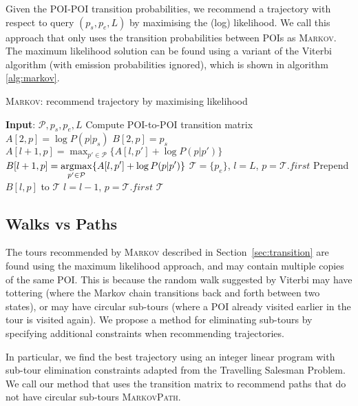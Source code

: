 Given the POI-POI transition probabilities, we recommend a trajectory with respect to query
$(p_s, p_e, L)$ by maximising the (log) likelihood. We call this approach that only uses the
transition probabilities between POIs as \textsc{Markov}. The maximum likelihood solution
can be found using a variant of the Viterbi algorithm (with emission probabilities ignored),
which is shown in algorithm \ref{alg:markov}.

\begin{algorithm}[t]
\caption{\textsc{Markov}: recommend trajectory by maximising likelihood}
\label{alg:markov}
\begin{algorithmic}[1]
\STATE \textbf{Input}: $\mathcal{P}, p_s, p_e, L$
\STATE Compute POI-to-POI transition matrix
    \STATE $A[2, p] = \log P(p|p_s)$
    \STATE $B[2, p] = p_s$
\ENDFOR
{}
        \STATE \(\displaystyle A[l+1, p] = \max_{p' \in \mathcal{P}} \{ A[l, p'] + \log P(p|p') \} \)
        \STATE \(\displaystyle B[l+1, p] = \operatorname*{argmax}_{p' \in \mathcal{P}} \{ A[l, p'] + \log P(p|p') \} \)
    \ENDFOR
\ENDFOR
\STATE $\mathcal{T} = \{p_e\}$, $l = L$, $p = \mathcal{T}.first$
\REPEAT
    \STATE Prepend $B[l, p]$ to $\mathcal{T}$
    \STATE $l = l - 1$, $p = \mathcal{T}.first$
\RETURN $\mathcal{T}$
\end{algorithmic}
\end{algorithm}



\subsection{Walks vs Paths}
\label{sec:walkpath}

The tours recommended by \textsc{Markov} described in Section~\ref{sec:transition} are found
using the maximum likelihood approach, and may contain multiple copies of the same POI.
This is because the random walk suggested by Viterbi may have
tottering (where the Markov chain transitions back and forth between two states),
or may have circular sub-tours (where a POI already visited earlier in the tour is
visited again).
We propose a method for eliminating sub-tours by specifying additional constraints
when recommending trajectories.

In particular, we find the best trajectory using an integer linear program with
sub-tour elimination constraints adapted from the Travelling Salesman Problem\cite{opt98}.
We call our method that uses the transition matrix to recommend paths
that do not have circular sub-tours \textsc{MarkovPath}.

